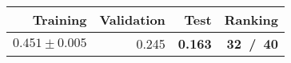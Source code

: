 \begin{tabular}{r|r|r|r}
Training          & Validation & \textbf{Test}  & \textbf{Ranking} \\ \hline
$0.451 \pm 0.005$ & 0.245      & \textbf{0.163} & \textbf{32~/~40} \\ \hline
\end{tabular}
